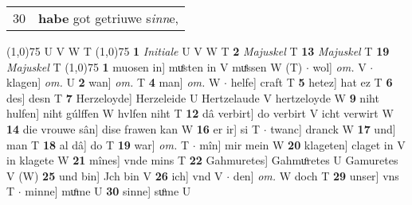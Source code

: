 \documentclass[8pt,a4paper,notitlepage]{article}
\begin{document}
\begin{table}[ht]
\begin{minipage}[t]{0.5\linewidth}
\begin{tabular}{rl}
30 & \textbf{habe} got getriuwe s\textit{inn}e,\\ 
\end{tabular}
\scriptsize
\line(1,0){75} \newline
U V W T \newline
\line(1,0){75} \newline
\textbf{1} \textit{Initiale} U V W T  \textbf{2} \textit{Majuskel} T  \textbf{13} \textit{Majuskel} T  \textbf{19} \textit{Majuskel} T  \newline
\line(1,0){75} \newline
\textbf{1} muosen in] muͤsten in V muͤssen W (T)  $\cdot$ wol] \textit{om.} V  $\cdot$ klagen] \textit{om.} U \textbf{2} wan] \textit{om.} T \textbf{4} man] \textit{om.} W  $\cdot$ helfe] craft T \textbf{5} hetez] hat ez T \textbf{6} des] desn T \textbf{7} Herzeloyde] Herzeleide U Hertzelaude V hertzeloyde W \textbf{9} niht hulfen] niht gúlffen W hvlfen niht T \textbf{12} dâ verbirt] do verbirt V icht verwirt W \textbf{14} die vrouwe sân] dise frawen kan W \textbf{16} er ir] si T  $\cdot$ twanc] dranck W \textbf{17} und] man T \textbf{18} al dâ] do T \textbf{19} war] \textit{om.} T  $\cdot$ mîn] mir mein W \textbf{20} klageten] claget in V in klagete W \textbf{21} mînes] vnde mins T \textbf{22} Gahmuretes] Gahmuͦretes U Gamuretes V (W) \textbf{25} und bin] Jch bin V \textbf{26} ich] vnd V  $\cdot$ den] \textit{om.} W doch T \textbf{29} unser] vns T  $\cdot$ minne] muͦme U \textbf{30} sinne] suͦme U \newline
\end{minipage}
\end{table}
\end{document}
